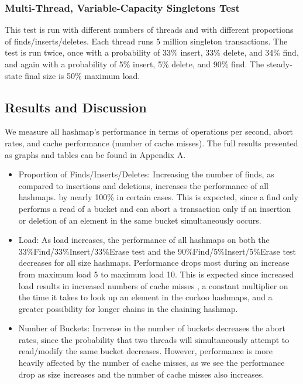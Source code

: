 \subsubsection{Multi-Thread, Variable-Capacity Singletons Test} 
This test is run with different numbers of threads and with different proportions of finds/inserts/deletes. Each thread runs 5 million singleton transactions.
The test is run twice, once with a probability of 33\% insert, 33\% delete, and 34\% find, and again with a probability of 5\% insert, 5\% delete, and 90\% find. The steady-state final size is 50\% maximum load.

\subsection{Results and Discussion}

We measure all hashmap's performance in terms of operations per second, abort rates, and cache performance (number of cache misses). The full results presented as graphs and tables can be found in Appendix A.

\begin{itemize}
    \item Proportion of Finds/Inserts/Deletes: Increasing the number of finds, as compared to insertions and deletions, increases the performance of all hashmaps. by nearly 100\% in certain cases. This is expected, since a find only performs a read of a bucket and can abort a transaction only if an insertion or deletion of an element in the same bucket simultaneously occurs.
    \item Load: As load increases, the performance of all hashmaps on both the 33\%Find/33\%Insert/33\%Erase test and the 90\%Find/5\%Insert/5\%Erase test decreases for all size hashmaps. Performance drops most during an increase from maximum load 5 to maximum load 10. This is expected since increased load results in increased numbers of cache misses , a constant multiplier on the time it takes to look up an element in the cuckoo hashmaps, and a greater possibility for longer chains in the chaining hashmap. 
    \item Number of Buckets: Increase in the number of buckets decreases the abort rates, since the probability that two threads will simultaneously attempt to read/modify the same bucket decreases. However, performance is more heavily affected by the number of cache misses, as we see the performance drop as size increases and the number of cache misses also increases. 
\end{itemize}

